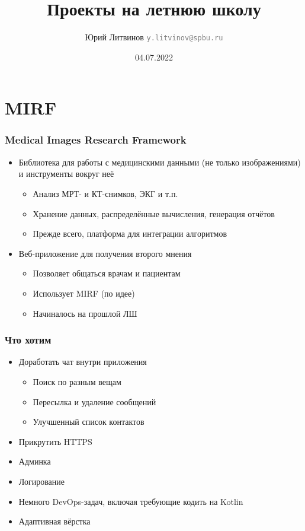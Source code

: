 \documentclass[xetex,mathserif,serif]{beamer}
\title{Проекты на летнюю школу}
\author[Юрий Литвинов]{Юрий Литвинов \newline \textcolor{gray}{\small\texttt{y.litvinov@spbu.ru}}}
\date{04.07.2022}
\begin{document}
    \frame{\titlepage}

    \section{MIRF}

    \begin{frame}
        \frametitle{Medical Images Research Framework}
        \begin{itemize}
            \item Библиотека для работы с медицинскими данными (не только изображениями) и инструменты вокруг неё
            \begin{itemize}
                \item Анализ МРТ- и КТ-снимков, ЭКГ и т.п.
                \item Хранение данных, распределённые вычисления, генерация отчётов
                \item Прежде всего, платформа для интеграции алгоритмов
            \end{itemize}
            \item Веб-приложение для получения второго мнения
            \begin{itemize}
                \item Позволяет общаться врачам и пациентам
                \item Использует MIRF (по идее)
                \item Начиналось на прошлой ЛШ
            \end{itemize}
        \end{itemize}
    \end{frame}

    \begin{frame}
        \frametitle{Что хотим}
        \begin{itemize}
            \item Доработать чат внутри приложения
            \begin{itemize}
                \item Поиск по разным вещам
                \item Пересылка и удаление сообщений
                \item Улучшенный список контактов
            \end{itemize}
            \item Прикрутить HTTPS
            \item Админка
            \item Логирование
            \item Немного DevOps-задач, включая требующие кодить на Kotlin
            \item Адаптивная вёрстка
        \end{itemize}
    \end{frame}
\end{document}
